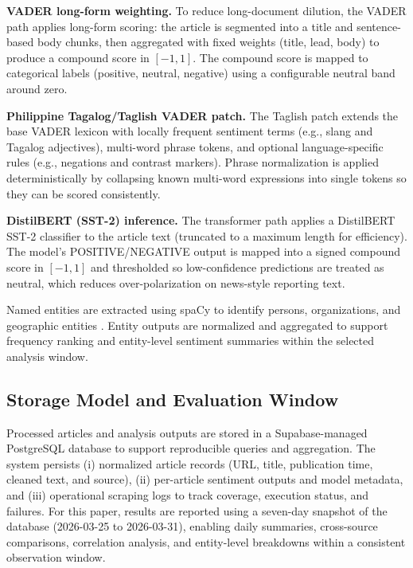 \documentclass[sigconf, nonacm]{acmart}
\begin{document}
\textbf{VADER long-form weighting.} To reduce long-document dilution, the VADER path applies long-form scoring: the article is segmented into a title and sentence-based body chunks, then aggregated with fixed weights (title, lead, body) to produce a compound score in $[-1,1]$. The compound score is mapped to categorical labels (positive, neutral, negative) using a configurable neutral band around zero.

\textbf{Philippine Tagalog/Taglish VADER patch.} The Taglish patch extends the base VADER lexicon with locally frequent sentiment terms (e.g., slang and Tagalog adjectives), multi-word phrase tokens, and optional language-specific rules (e.g., negations and contrast markers). Phrase normalization is applied deterministically by collapsing known multi-word expressions into single tokens so they can be scored consistently.

\textbf{DistilBERT (SST-2) inference.} The transformer path applies a DistilBERT SST-2 classifier to the article text (truncated to a maximum length for efficiency). The model’s POSITIVE/NEGATIVE output is mapped into a signed compound score in $[-1,1]$ and thresholded so low-confidence predictions are treated as neutral, which reduces over-polarization on news-style reporting text.

Named entities are extracted using spaCy \cite{spacy} to identify persons, organizations, and geographic entities \cite{nadeau2007ner}. Entity outputs are normalized and aggregated to support frequency ranking and entity-level sentiment summaries within the selected analysis window.


\subsection{Storage Model and Evaluation Window}
Processed articles and analysis outputs are stored in a Supabase-managed PostgreSQL database \cite{supabase,postgresql} to support reproducible queries and aggregation. The system persists (i) normalized article records (URL, title, publication time, cleaned text, and source), (ii) per-article sentiment outputs and model metadata, and (iii) operational scraping logs to track coverage, execution status, and failures. For this paper, results are reported using a seven-day snapshot of the database (2026-03-25 to 2026-03-31), enabling daily summaries, cross-source comparisons, correlation analysis, and entity-level breakdowns within a consistent observation window.
\end{document}
